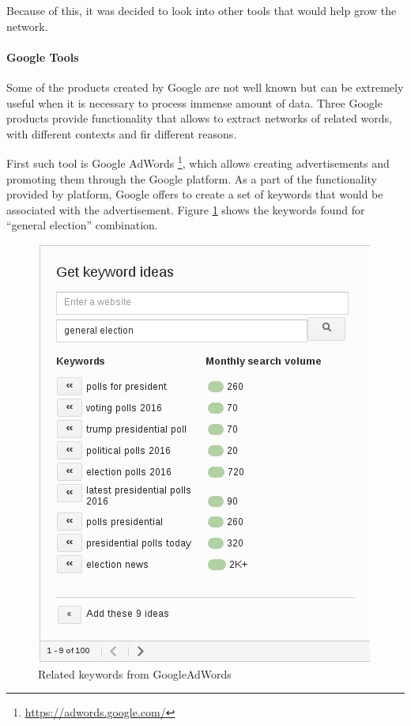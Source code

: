 Because of this, it was decided to look into other tools that would help grow the network.

\paragraph{Google Tools}
Some of the products created by Google are not well known but can be extremely useful when it is necessary to process immense amount of data. Three Google products provide functionality that allows to extract networks of related words, with different contexts and fir different reasons.

First such tool is Google AdWords \footnote{\url{https://adwords.google.com/}}, which allows creating advertisements and promoting them through the Google platform. As a part of the functionality provided by platform, Google offers to create a set of keywords that would be associated with the advertisement. Figure \ref{fig:googleads} shows the keywords found for ``general election'' combination. 

\begin{figure}[ht]
\includegraphics[]{googleads}
\caption{Related keywords from GoogleAdWords}
\label{fig:googleads}
\end{figure}


